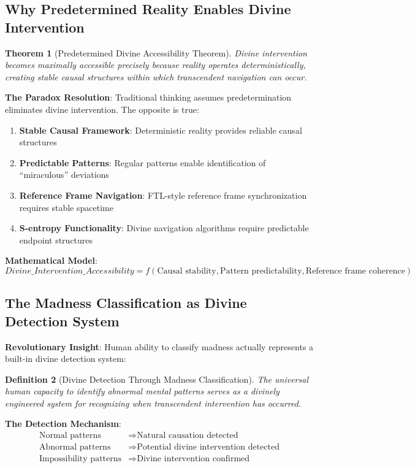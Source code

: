 \documentclass[12pt,a4paper]{article}
\newtheorem{theorem}{Theorem}[section]
\newtheorem{definition}[theorem]{Definition}
\begin{document}
\subsection{Why Predetermined Reality Enables Divine Intervention}

\begin{theorem}[Predetermined Divine Accessibility Theorem]
Divine intervention becomes maximally accessible precisely because reality operates deterministically, creating stable causal structures within which transcendent navigation can occur.
\end{theorem}

\textbf{The Paradox Resolution}:
Traditional thinking assumes predetermination eliminates divine intervention. The opposite is true:

\begin{enumerate}
\item \textbf{Stable Causal Framework}: Deterministic reality provides reliable causal structures
\item \textbf{Predictable Patterns}: Regular patterns enable identification of ``miraculous'' deviations
\item \textbf{Reference Frame Navigation}: FTL-style reference frame synchronization requires stable spacetime
\item \textbf{S-entropy Functionality}: Divine navigation algorithms require predictable endpoint structures
\end{enumerate}

\textbf{Mathematical Model}:
$$Divine\_Intervention\_Accessibility = f(\text{Causal stability}, \text{Pattern predictability}, \text{Reference frame coherence})$$

\subsection{The Madness Classification as Divine Detection System}

\textbf{Revolutionary Insight}: Human ability to classify madness actually represents a built-in divine detection system:

\begin{definition}[Divine Detection Through Madness Classification]
The universal human capacity to identify abnormal mental patterns serves as a divinely engineered system for recognizing when transcendent intervention has occurred.
\end{definition}

\textbf{The Detection Mechanism}:
\begin{align}
\text{Normal patterns} &\Rightarrow \text{Natural causation detected}\\
\text{Abnormal patterns} &\Rightarrow \text{Potential divine intervention detected}\\
\text{Impossibility patterns} &\Rightarrow \text{Divine intervention confirmed}
\end{align}
\end{document}
